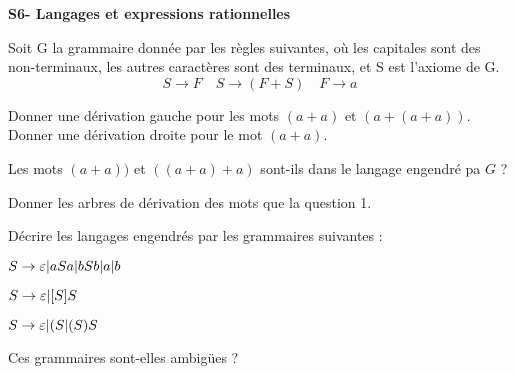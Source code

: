 \documentclass[french]{article}
\begin{document}
\begin{center}
    \huge{\textbf{S6- Langages et expressions rationnelles}}
\end{center}

\begin{exo}
    Soit G la grammaire donnée par les règles suivantes, où les capitales sont des
    non-terminaux, les autres caractères sont des terminaux, et S est l'axiome de G.
    \[S\to F\quad S\to(F+S)\quad F\to a\]
    \begin{q}{1}
        Donner une dérivation gauche pour les mots \((a+a)\) et \((a+(a+a))\).
        Donner une dérivation droite pour le mot \((a+a)\).
    \end{q}
    \begin{q}{2}
        Les mots \((a+a))\) et \(((a+a)+a)\) sont-ils dans le langage engendré pa
        \(G\) ?
    \end{q}
    \begin{q}{3}
        Donner les arbres de dérivation des mots que la question 1.
    \end{q}
\end{exo}

\begin{exo}
    Décrire les langages engendrés par les grammaires suivantes :
    \begin{q}{1}
        \(S\to\varepsilon|aSa|bSb|a|b\)
    \end{q}
    \begin{q}{2}
        \(S\to\varepsilon|[S]S\)
    \end{q}
    \begin{q}{3}
        \(S\to\varepsilon|(S| (S)S\)
    \end{q}
    Ces grammaires sont-elles ambigües ?
\end{exo}
\end{document}
